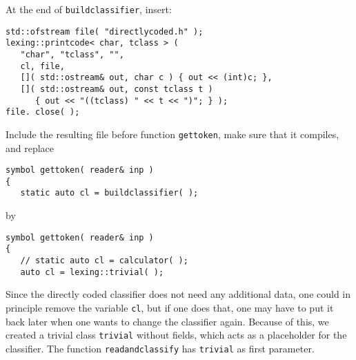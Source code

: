 \documentclass{article}
\begin{document}
\begin{itemize}
\noindent
At the end of \verb+buildclassifier+,
insert: 
\begin{verbatim}
std::ofstream file( "directlycoded.h" );
lexing::printcode< char, tclass > ( 
   "char", "tclass", "",
   cl, file,
   []( std::ostream& out, char c ) { out << (int)c; },
   []( std::ostream& out, const tclass t )
      { out << "((tclass) " << t << ")"; } );
file. close( );
\end{verbatim}

Include the resulting file before function
\verb+gettoken+, make sure that it compiles,
and replace
\begin{verbatim}
symbol gettoken( reader& inp )
{
   static auto cl = buildclassifier( );
\end{verbatim}
by
\begin{verbatim}
symbol gettoken( reader& inp )
{
   // static auto cl = calculator( );
   auto cl = lexing::trivial( ); \end{verbatim}

   Since the directly coded classifier 
   does not need any additional data, 
   one could in principle remove the variable
   \verb+cl+, but if one does that, one
   may have to put it back later when one wants to
   change the classifier again. 
   Because of this, we created a trivial
   class \verb+trivial+ without fields, 
   which acts as a placeholder for 
   the classifier. 
   The function \verb+readandclassify+ has
   \verb+trivial+ as first parameter.
\end{itemize}
\end{document}
